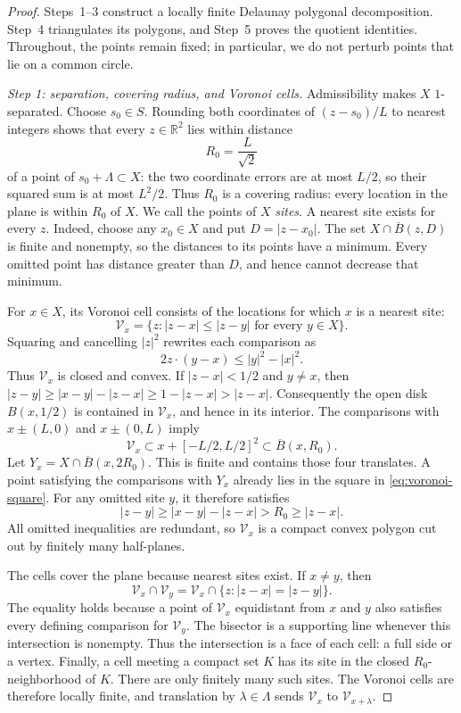 \documentclass[11pt,a4paper]{article}
\theoremstyle{definition}
\theoremstyle{remark}
\newcommand{\R}{\mathbb{R}}
\begin{document}
\begin{proof}
Steps~1--3 construct a locally finite Delaunay polygonal decomposition.
Step~4 triangulates its polygons, and Step~5 proves the quotient
identities. Throughout, the points remain fixed; in particular, we do not perturb
points that lie on a common circle.

\smallskip\noindent
\emph{Step 1: separation, covering radius, and Voronoi cells.}
Admissibility makes $X$ $1$-separated. Choose $s_0\in S$. Rounding both
coordinates of $(z-s_0)/L$ to nearest integers shows that every
$z\in\R^2$ lies within distance
\[
R_0=\frac{L}{\sqrt2}
\]
of a point of $s_0+\Lambda\subset X$: the two coordinate errors are at
most $L/2$, so their squared sum is at most $L^2/2$. Thus $R_0$ is a covering radius: every location in the plane is within
$R_0$ of $X$. We call the points of $X$ \emph{sites}. A nearest site
exists for every $z$. Indeed, choose any $x_0\in X$ and put
$D=|z-x_0|$. The set $X\cap\overline B(z,D)$ is finite and nonempty,
so the distances to its points have a minimum. Every omitted point has
distance greater than $D$, and hence cannot decrease that minimum.

For $x\in X$, its Voronoi cell consists of the locations for which $x$
is a nearest site:
\[
\mathcal V_x=\{z:|z-x|\leq|z-y|\text{ for every }y\in X\}.
\]
Squaring and cancelling $|z|^2$ rewrites each comparison as
\[
2z\cdot(y-x)\leq |y|^2-|x|^2.
\]
Thus $\mathcal V_x$ is closed and convex. If $|z-x|<1/2$ and $y\ne x$,
then $|z-y|\geq |x-y|-|z-x|\geq1-|z-x|>|z-x|$.
Consequently the open disk $B(x,1/2)$ is contained in $\mathcal V_x$,
and hence in its interior. The comparisons with
$x\pm(L,0)$ and $x\pm(0,L)$ imply
\begin{equation}
\label{eq:voronoi-square}
\mathcal V_x\subset x+[-L/2,L/2]^2
\subset\overline B(x,R_0).
\end{equation}
Let $Y_x=X\cap\overline B(x,2R_0)$. This is finite and contains those four
translates. A point satisfying the comparisons with $Y_x$ already lies
in the square in \eqref{eq:voronoi-square}. For any omitted site $y$, it
therefore satisfies
\[
|z-y|\geq|x-y|-|z-x|>R_0\geq|z-x|.
\]
All omitted inequalities are redundant, so $\mathcal V_x$ is a compact
convex polygon cut out by finitely many half-planes.

The cells cover the plane because nearest sites exist. If $x\ne y$, then
\[
\mathcal V_x\cap\mathcal V_y
=\mathcal V_x\cap\{z:|z-x|=|z-y|\}.
\]
The equality holds because a point of $\mathcal V_x$ equidistant from
$x$ and $y$ also satisfies every defining comparison for
$\mathcal V_y$. The bisector is a supporting line whenever this
intersection is nonempty. Thus the intersection is a face of each cell:
a full side or a vertex. Finally, a cell meeting
a compact set $K$ has its site in the closed $R_0$-neighborhood of $K$.
There are only finitely many such sites. The Voronoi cells are therefore
locally finite, and translation by $\lambda\in\Lambda$ sends
$\mathcal V_x$ to $\mathcal V_{x+\lambda}$.


\end{proof}
\end{document}
